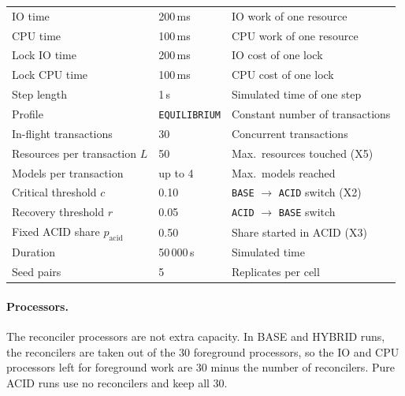 \begin{table}[htbp]
\begin{tabular*}{\textwidth}{@{\extracolsep{\fill}} l l l@{}}
    IO time                              & 200\,ms              & IO work of one
    resource                  \\
    CPU time                             & 100\,ms              & CPU work of
    one resource                 \\
    Lock IO time                         & 200\,ms              & IO cost of one
    lock                      \\
    Lock CPU time                        & 100\,ms              & CPU cost of
    one lock                     \\
    Step length                          & 1\,s                 & Simulated time
    of one step               \\
    Profile                              & \texttt{EQUILIBRIUM} & Constant
    number of transactions          \\
    In-flight transactions               & 30                   & Concurrent
    transactions                  \\
    Resources per transaction $L$        & 50                   & Max.\
    resources touched (X5)             \\
    Models per transaction               & up to 4              & Max.\ models
    reached \\
    Critical threshold $c$               & 0.10                 & \texttt{BASE}
    $\rightarrow$ \texttt{ACID} switch (X2) \\
    Recovery threshold $r$               & 0.05                 & \texttt{ACID}
    $\rightarrow$ \texttt{BASE} switch \\
    Fixed ACID share $p_{\mathrm{acid}}$ & 0.50                 & Share started
    in ACID (X3)               \\
    Duration                             & 50\,000\,s           & Simulated time
    \\
    Seed pairs                           & 5                    & Replicates per
    cell                      \\
    \bottomrule
  \end{tabular*}
\end{table}

\paragraph{Processors.} The reconciler processors are not extra capacity. In
BASE and HYBRID runs, the reconcilers are taken out of the 30 foreground
processors, so the IO and CPU processors left for foreground work are 30 minus
the number of reconcilers. Pure ACID runs use no reconcilers and keep all 30.

